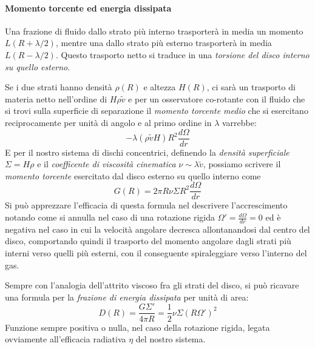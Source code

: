 \documentclass[a4paperbi]{article}
\begin{document}
	\paragraph{Momento torcente ed energia dissipata}
	Una frazione di fluido dallo strato più interno trasporterà in media un momento $L(R+\lambda/2)$, mentre una dallo strato più esterno trasporterà in media $L(R-\lambda/2)$. Questo trasporto netto si traduce in una \textit{torsione del disco interno su quello esterno}.
	
	Se i due strati hanno densità $\rho(R)$ e altezza $H(R)$, ci sarà un trasporto di materia netto nell'ordine di $H\rho\tilde{v}$ e per un osservatore co-rotante con il fluido che si trovi sulla superficie di separazione il \textit{momento torcente medio} che si esercitano reciprocamente per unità di angolo e al primo ordine in $\lambda$ varrebbe:
	\begin{equation*}
		-\lambda(\rho\tilde{v} H) R^2\frac{d\Omega}{dr}
	\end{equation*}
	E per il nostro sistema di dischi concentrici, definendo la \textit{densità superficiale} $\Sigma=H\rho$ e il \textit{coefficente di viscosità cinematica} $\nu\sim\lambda\tilde{v}$, possiamo scrivere il \textit{momento torcente} esercitato dal disco esterno su quello interno come
	\begin{equation}
		G(R)=2\pi R\nu\Sigma R^2\frac{d\Omega}{dr}
	\end{equation}
	Si può apprezzare l'efficacia di questa formula nel descrivere l'accrescimento notando come si annulla nel caso di una rotazione rigida $\Omega'=\frac{d\Omega}{dr}=0$ ed è negativa nel caso in cui la velocità angolare decresca allontanandosi dal centro del disco, comportando quindi il trasporto del momento angolare dagli strati più interni verso quelli più esterni, con il conseguente spiraleggiare verso l'interno del gas.
		
	Sempre con l'analogia dell'attrito viscoso fra gli strati del disco, si può ricavare una formula per la \textit{frazione di energia dissipata} per unità di area:
	\begin{equation}
		D(R)=\frac{G\Sigma'}{4\pi R}=\frac{1}{2}\nu\Sigma(R\Omega')^2
	\end{equation}
	Funzione sempre positiva o nulla, nel caso della rotazione rigida, legata ovviamente all'efficacia radiativa $\eta$ del nostro sistema.
	
\end{document}
